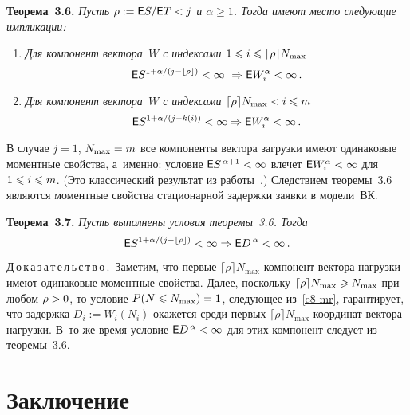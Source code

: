 \begin{multicols}{2}
\noindent
\textbf{Теорема~3.6.}
\textit{Пусть $\rho:={\sf E} S/{\sf E} T<j$ и   $\alpha\geqslant 1$.
Тогда имеют место
    следующие импликации:}
\begin{enumerate}[1.]
\item \textit{Для компонент вектора~$W$ с индексами 
$1\hm\leqslant i\hm\leqslant \lceil\rho\rceil N_{\max}$}
        \begin{equation*}
        {\sf E} S^{1+{\alpha}/({j-\lfloor\rho\rfloor})}<\infty\  \Rightarrow
        {\sf E} W_i ^\alpha<\infty\,.
        \end{equation*}
\item \textit{Для компонент вектора~$W$ с индексами $\lceil\rho\rceil N_{\max}<i\hm\leqslant m$}
        \begin{equation*}
        {\sf E} S^{1+{\alpha}/({j-k(i)})}<\infty  \Rightarrow   {\sf E} W_i^\alpha<\infty\,.
        \end{equation*}
\end{enumerate}

\smallskip

В случае $j=1$, $N_{\max}\hm=m$ все компоненты  вектора загрузки имеют
одинаковые моментные свойства, а~именно: условие  $\e
S^{\,\alpha+1}\hm<\infty$ влечет $\e W_i^\alpha\hm<\infty$ для $1\hm\leqslant i\hm\leqslant m$. 
(Это классический результат из работы~\cite{Kiefer1}.) Следствием теоремы~3.6 являются
моментные свойства стационарной  задержки заявки в модели~ВК.


\medskip

\noindent
\textbf{Теорема~3.7.} \textit{Пусть выполнены условия теоремы~3.6.
    Тогда}
    \begin{equation*}
    {\sf E} S^{1+{\alpha}/({j-\lfloor \rho\rfloor})}<\infty\Rightarrow {\sf E} D^{\,\alpha}<\infty\,.
    \end{equation*}

\medskip


\noindent
Д\,о\,к\,а\,з\,а\,т\,е\,л\,ь\,с\,т\,в\,о\,.\
 Заметим, что  первые
$\lceil\rho\rceil N_{\max}${} компонент  вектора нагрузки имеют
одинаковые моментные свойства. Далее, поскольку $\lceil\rho\rceil
N_{\max}\hm\geqslant N_{\max}$ при любом $\rho\hm>0$, то условие
$P(N\hm\leqslant N_{\max})\hm=1$, следующее из~\eqref{e8-mr}, гарантирует, что
задержка $D_{i}:=W_{i}(N_{i})$ окажется среди первых
$\lceil\rho\rceil N_{\max}$ координат вектора нагрузки. В~то же
время условие $\e D^{\,\alpha}\hm<\infty$  для этих компонент  следует
из теоремы~3.6.


\section{Заключение}\label{sec4}


\end{multicols}
